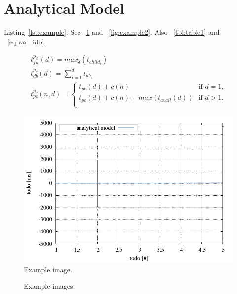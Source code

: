 \section{Analytical Model}\label{sec:analyze}

Listing~\ref{lst:example}. See \figurename~\ref{fig:example1} and \figurename~\ref{fig:example2}. Also \tablename~\ref{tbl:table1} and \equationname~\ref{eq:var_idb}.

\lstset{language=Java, caption=Example Code, %
label=lst:example, numbers=left, stepnumber=1}


\small
\begin{equation}
  \begin{array}{l}
    \displaystyle t^{p_d}_{fw}(d) = max_{d}(t_{child_{i}}) \\
    \displaystyle t^{p_d}_{db}(d) = \sum_{i=1}^{d} t_{db_{i}} \\
    \displaystyle t^{p_d}_{pc}(n,d) =
    	\begin{cases}
        	t_{pc}(d) + c(n) & \text{if $d = 1$,}\\
        	t_{pc}(d) + c(n) + max(t_{avail}(d)) & \text{if $d>1$.}\\
        \end{cases}
  \end{array}
  \label{eq:var_idb}
\end{equation}
\normalsize

\begin{figure}
    \centering
    \includegraphics[width=.45\textwidth]{resources/images/example1.pdf} 
    \caption{Example image.}
    \label{fig:example1}
\end{figure}

\begin{figure}
    \centering
    \caption{Example images.}
    \label{fig:exammple2_3}
\end{figure}

